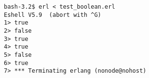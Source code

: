 \begin{questions}
\begin{solution}
{\begin{verbatim}
bash-3.2$ erl < test_boolean.erl                                                  
Eshell V5.9  (abort with ^G)                                                      
1> true                                                                           
2> false                                                                          
3> true                                                                           
4> true                                                                           
5> false                                                                          
6> true                                                                           
7> *** Terminating erlang (nonode@nohost)                                         
\end{verbatim}
        }

\end{solution}

   
\end{questions}


